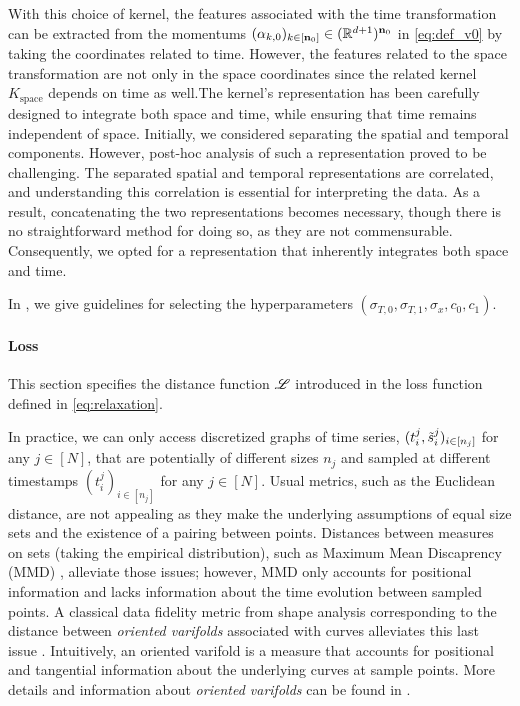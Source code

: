 \begin{remark}
  \label{remark:spaceandtime}
  With this choice of kernel, the features associated with the time transformation can be extracted from the momentums $(\alpha_{k,0})_{k\in[\mathbf{n}_0]}\in (\mathbb{R}^{d+1})^{\mathbf{n}_0}$ in \eqref{eq:def_v0} by taking the coordinates related to time. However, the features related to the space transformation are not only in the space coordinates since the related kernel $K_{\text{space}}$ depends on time as well.The kernel's representation has been carefully designed to integrate both space and time, while ensuring that time remains independent of space. Initially, we considered separating the spatial and temporal components. However, post-hoc analysis of such a representation proved to be challenging. The separated spatial and temporal representations are correlated, and understanding this correlation is essential for interpreting the data. As a result, concatenating the two representations becomes necessary, though there is no straightforward method for doing so, as they are not commensurable. Consequently, we opted for a representation that inherently integrates both space and time.
\end{remark}
In , we give guidelines for selecting the hyperparameters $(\sigma_{T,0},\sigma_{T,1},\sigma_x,c_0,c_1)$.
  
\vspace{-1ex}
\paragraph{Loss}
This section specifies the distance function $\mathscr{L}$ introduced in the loss function defined in \eqref{eq:relaxation}. 

In practice, we can only access discretized graphs of time series, $(t_i^j,\tilde{s}^j_i)_{i\in[n_j]}$ for any $j\in[N]$, that are potentially of different sizes $n_j$ and sampled at different timestamps $(t_i^j)_{i\in[n_j]}$ for any $j\in[N]$. Usual metrics, such as the Euclidean distance, are not appealing as they make the underlying assumptions of equal size sets and the existence of a pairing between points. Distances between measures on sets (taking the empirical distribution), such as Maximum Mean Discaprency (MMD) \cite{dziugaite2015training,borgwardt2006integrating}, alleviate those issues; however, MMD only accounts for positional information and lacks information about the time evolution between sampled points. A classical data fidelity metric from shape analysis corresponding to the distance between \textit{oriented varifolds} associated with curves alleviates this last issue \cite{kaltenmark2017general}. Intuitively, an oriented varifold is a measure that accounts for positional and tangential information about the underlying curves at sample points. More details and information about \textit{oriented varifolds} can be found in . 


